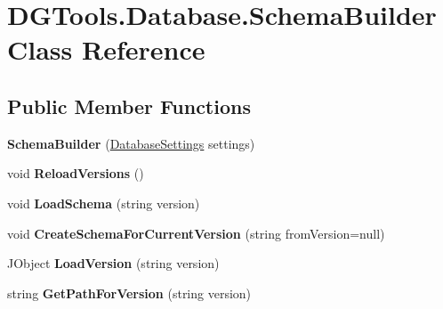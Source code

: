 \hypertarget{class_d_g_tools_1_1_database_1_1_schema_builder}{}\section{D\+G\+Tools.\+Database.\+Schema\+Builder Class Reference}
\label{class_d_g_tools_1_1_database_1_1_schema_builder}
\subsection*{Public Member Functions}
\begin{DoxyCompactItemize}
\item 
\mbox{\label{class_d_g_tools_1_1_database_1_1_schema_builder_ab71c723b87f2c6176379c2b8176d66c9}} 
{\bfseries Schema\+Builder} (\mbox{\hyperlink{class_d_g_tools_1_1_database_1_1_database_settings}{Database\+Settings}} settings)
\item 
\mbox{\label{class_d_g_tools_1_1_database_1_1_schema_builder_a99ed1ba9ff89ffaabb1c4bb5453fe36a}} 
void {\bfseries Reload\+Versions} ()
\item 
\mbox{\label{class_d_g_tools_1_1_database_1_1_schema_builder_a7e6a8175d8a4ca81524ead3c6dc3df0e}} 
void {\bfseries Load\+Schema} (string version)
\item 
\mbox{\label{class_d_g_tools_1_1_database_1_1_schema_builder_a1e052d4830fc7398cda6d8e1fe0727eb}} 
void {\bfseries Create\+Schema\+For\+Current\+Version} (string from\+Version=null)
\item 
\mbox{\label{class_d_g_tools_1_1_database_1_1_schema_builder_ae532e3d09620f780e3465c32469bca6b}} 
J\+Object {\bfseries Load\+Version} (string version)
\item 
\mbox{\label{class_d_g_tools_1_1_database_1_1_schema_builder_a83091fabafe2427685c27ab788ae5a9f}} 
string {\bfseries Get\+Path\+For\+Version} (string version)
\item 
\mbox{\label{class_d_g_tools_1_1_database_1_1_schema_builder_a834e162ea0fe2695f961339849d68faf}} 

\end{DoxyCompactItemize}
